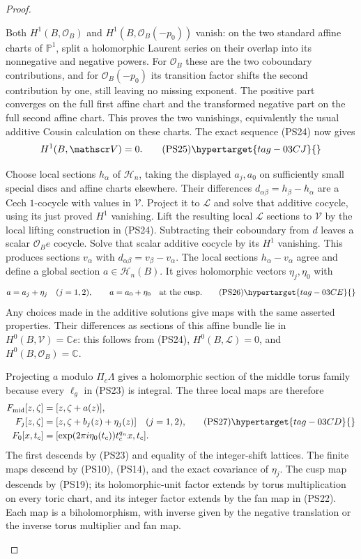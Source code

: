 \begin{proof}
\begin{enumerate}[label=\arabic*.,leftmargin=*]
Both $H^1(B,\mathcal O_B)$ and
$H^1(B,\mathcal O_B(-p_0))$ vanish: on the two standard affine
charts of $\mathbb P^1$, split a holomorphic Laurent series on
their overlap into its nonnegative and negative powers. For
$\mathcal O_B$ these are the two coboundary contributions, and
for $\mathcal O_B(-p_0)$ its transition factor shifts the second
contribution by one, still leaving no missing exponent. The positive
part converges on the full first affine chart and the transformed
negative part on the full second affine chart. This proves the two
vanishings, equivalently the usual additive Cousin calculation on
these charts. The exact sequence (PS24) now gives
\[
                             H^1(B,\mathscr V)=0.
 \tag{PS25}\hypertarget{tag-03CJ}{}\label{wb:pshift:eq:no-analytic-obstruction}
\]

Choose
local sections $h_\alpha$ of $\mathscr H_n$, taking the displayed
$a_j,a_0$ on sufficiently small special discs and affine charts
elsewhere. Their differences $d_{\alpha\beta}=h_\beta-h_\alpha$
are a Cech $1$-cocycle with values in $\mathscr V$. Project it to
$\mathcal L$ and solve that additive cocycle, using its just proved
$H^1$ vanishing. Lift the resulting local $\mathcal L$ sections to
$\mathscr V$ by the local lifting construction in (PS24). Subtracting
their coboundary from $d$ leaves a scalar $\mathcal O_Be$ cocycle.
Solve that scalar additive cocycle by its $H^1$ vanishing. This
produces sections $v_\alpha$ with
$d_{\alpha\beta}=v_\beta-v_\alpha$. The local sections
$h_\alpha-v_\alpha$ agree and define a global section
$a\in\mathscr H_n(B)$. It gives holomorphic vectors $\eta_j,\eta_0$ with
\[
 a=a_j+\eta_j\quad(j=1,2),\qquad a=a_0+\eta_0
                              \quad\hbox{at the cusp}.
 \tag{PS26}\hypertarget{tag-03CE}{}\label{wb:pshift:eq:global-correction}
\]
Any choices made in the additive solutions give maps with the same
asserted properties. Their differences as sections of this affine
bundle lie in $H^0(B,\mathscr V)=\mathbb C e$: this follows from
(PS24), $H^0(B,\mathcal L)=0$, and $H^0(B,\mathcal O_B)=\mathbb C$.

Projecting $a$ modulo $\Pi_c\Lambda$ gives a holomorphic section of
the middle torus family because every $\ell_g$ in (PS23) is integral.
The three local maps are therefore
\[
\begin{aligned}
 F_{\mathrm{mid}}[z,\zeta]&=[z,\zeta+a(z)],\\
 F_j[z,\zeta]&=[z,\zeta+b_j(z)+\eta_j(z)]\quad(j=1,2),\\
 F_0[x,t_c]&=[\exp(2\pi i\eta_0(t_c))t_c^{q_n}x,t_c].
\end{aligned}
\tag{PS27}\hypertarget{tag-03CD}{}\label{wb:pshift:eq:full-isomorphism}
\]
The first descends by (PS23) and equality of the integer-shift
lattices. The finite maps descend by (PS10), (PS14), and the exact
covariance of $\eta_j$. The cusp map descends by (PS19); its
holomorphic-unit factor extends by torus multiplication on every
toric chart, and its integer factor extends by the fan map in
(PS22). Each map is a biholomorphism, with inverse given by the
negative translation or the inverse torus multiplier and fan map.


\end{enumerate}
\end{proof}
